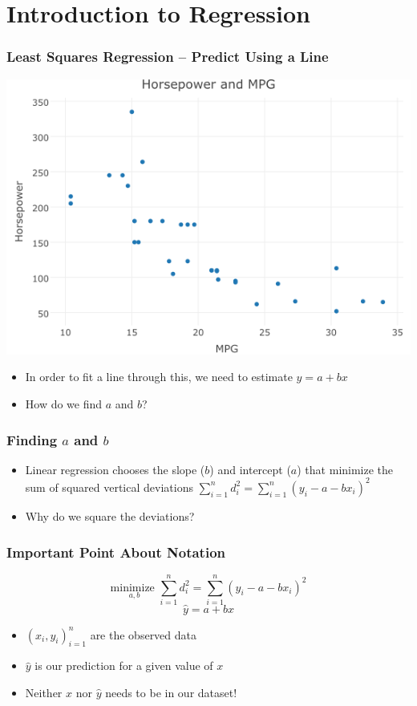 \documentclass{beamer}
\begin{document}
\section{Introduction to Regression}
\begin{frame}
\frametitle{Least Squares Regression -- Predict Using a Line}
	\begin{center}
		\includegraphics[scale=0.4]{./images/cars.png}
	\end{center}
	\begin{itemize}
		\item In order to fit a line through this, we need to estimate $y = a + bx$
		\item How do we find $a$ and $b$?
	\end{itemize}
\end{frame}
	
\begin{frame}
\frametitle{Finding $a$ and $b$}
	\begin{itemize}
		\item Linear regression chooses the slope ($b$) and intercept ($a$) that \alert{minimize the 		sum of squared vertical deviations}
		$\displaystyle\sum_{i = 1}^n d_i^2 = \sum_{i = 1}^n (y_i - a - b x_i)^2$
		\medskip
		\item Why do we square the deviations?
	\end{itemize}
\end{frame}

\begin{frame}
\frametitle{Important Point About Notation}
  	$$
  	\boxed{\underset{a, b}{\mbox{minimize }}\sum_{i = 1}^n d_i^2 = \sum_{i = 1}^n 
  	(y_i - a - b x_i)^2}
  	$$
	$$
	\boxed{\hat{y} = a + bx}
	$$
	\begin{itemize}
		\item $(x_i, y_i)_{i = 1}^n$ are the \alert{observed data}
		\item $\widehat{y}$ is our \alert{prediction} for a given value of $x$
		\item Neither $x$ nor $\widehat{y}$ needs to be in our dataset!
	\end{itemize}
\end{frame}
\end{document}
